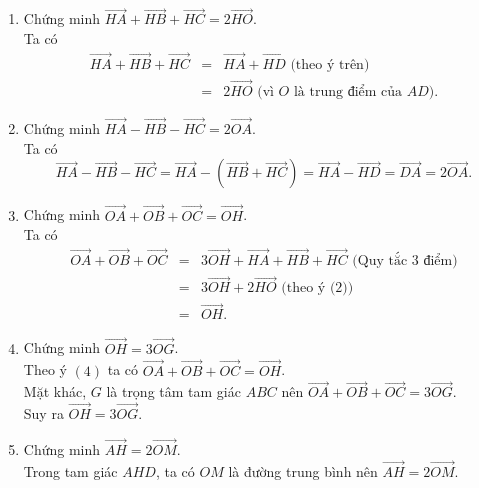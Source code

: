 \begin{bt}
{\begin{enumerate}
{
			}
			\item Chứng minh
			$\overrightarrow{HA}+\overrightarrow{HB}+\overrightarrow{HC}=2\overrightarrow{HO}$.\\
			Ta có 
			\allowdisplaybreaks
			\begin{eqnarray*}
				\overrightarrow{HA}+\overrightarrow{HB}+\overrightarrow{HC}
				&=&\overrightarrow{HA}+\overrightarrow{HD}\text{ (theo ý trên)}\\
				&=&2\overrightarrow{HO} \text{ (vì } O \text{ là trung điểm của } AD).
			\end{eqnarray*}			
			\item Chứng minh  $\overrightarrow{HA}-\overrightarrow{HB}-\overrightarrow{HC}=2\overrightarrow{OA}$.\\
			Ta có 
			$$\overrightarrow{HA}-\overrightarrow{HB}-\overrightarrow{HC}=\overrightarrow{HA}-\left(\overrightarrow{HB}+\overrightarrow{HC}\right)=\overrightarrow{HA}-\overrightarrow{HD}=\overrightarrow{DA}=2\overrightarrow{OA}.$$
			\item Chứng minh  $\overrightarrow{OA}+\overrightarrow{OB}+\overrightarrow{OC}=\overrightarrow{OH}$.\\
			Ta có 
			\begin{eqnarray*}
				\overrightarrow{OA}+\overrightarrow{OB}+\overrightarrow{OC} &=&3\overrightarrow{OH}+\overrightarrow{HA}+\overrightarrow{HB}+\overrightarrow{HC} \text{ (Quy tắc 3 điểm)}\\
				&=&3\overrightarrow{OH}+2\overrightarrow{HO}\text{ (theo ý (2))}\\
				&=&\overrightarrow{OH}.
			\end{eqnarray*}
			\item Chứng minh $\overrightarrow{OH}=3\overrightarrow{OG}$.\\
			Theo ý $(4)$ ta có $\overrightarrow{OA}+\overrightarrow{OB}+\overrightarrow{OC}=\overrightarrow{OH}$.\\
			Mặt khác, $G$ là trọng tâm tam giác $ABC$ nên $\overrightarrow{OA}+\overrightarrow{OB}+\overrightarrow{OC}=3\overrightarrow{OG}$.\\
			Suy ra $\overrightarrow{OH}=3\overrightarrow{OG}$.
			\item Chứng minh $\overrightarrow{AH}=2\overrightarrow{OM}$.\\
			Trong tam giác $AHD$, ta có $OM$ là đường trung bình nên $\overrightarrow{AH}=2\overrightarrow{OM}$.
	\end{enumerate}}
\end{bt}

